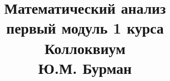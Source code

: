 \documentclass[fleqn]{article}
\title{Математический анализ \\ первый модуль 1 курса \\ Коллоквиум \\ Ю.М. Бурман}
\begin{document}
	\maketitle
	\pagebreak
	
	
	\tableofcontents
	
	\newpage
	
	
\end{document}
